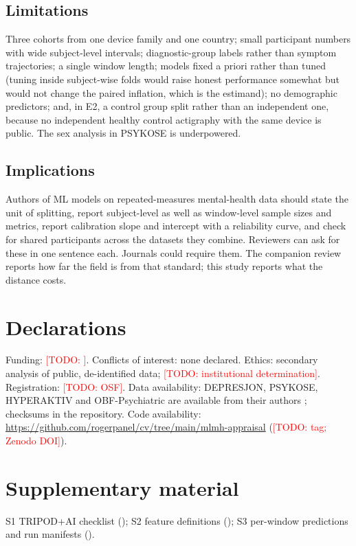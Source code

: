 \documentclass[11pt,a4paper]{article}
\newcommand{\todo}[1]{\textcolor{red}{[TODO: #1]}}
\begin{document}
\subsection{Limitations}
Three cohorts from one device family and one country; small participant numbers with wide
subject-level intervals; diagnostic-group labels rather than symptom trajectories; a single window
length; models fixed a priori rather than tuned (tuning inside subject-wise folds would raise honest
performance somewhat but would not change the paired inflation, which is the estimand); no
demographic predictors; and, in E2, a control group split rather than an independent one, because
no independent healthy control actigraphy with the same device is public. The sex analysis in
PSYKOSE is underpowered.

\subsection{Implications}
Authors of ML models on repeated-measures mental-health data should state the unit of splitting,
report subject-level as well as window-level sample sizes and metrics, report calibration slope and
intercept with a reliability curve, and check for shared participants across the datasets they
combine. Reviewers can ask for these in one sentence each. Journals could require them. The
companion review reports how far the field is from that standard; this study reports what the
distance costs.

\section*{Declarations}
Funding: \todo{}. Conflicts of interest: none declared. Ethics: secondary analysis of public,
de-identified data; \todo{institutional determination}. Registration: \todo{OSF}. Data availability:
DEPRESJON, PSYKOSE, HYPERAKTIV and OBF-Psychiatric are available from their authors
\cite{garciaceja2018,jakobsen2020,hicks2021,obf2025}; checksums in the repository. Code
availability: \url{https://github.com/rogerpanel/cv/tree/main/mlmh-appraisal} (\todo{tag; Zenodo DOI}).

\section*{Supplementary material}
S1 TRIPOD+AI checklist (); S2 feature definitions
(); S3 per-window predictions and run manifests
().
\end{document}
